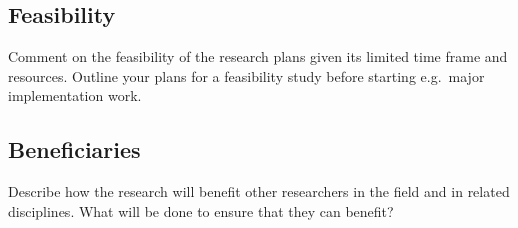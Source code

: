 \subsection{Feasibility}

Comment on the feasibility of the research plans given its limited time frame and resources. Outline your plans for a feasibility study before starting e.g.\ major implementation work.

\subsection{Beneficiaries}

Describe how the research will benefit other researchers in the field and in related disciplines. What will be done to ensure that they can benefit?
